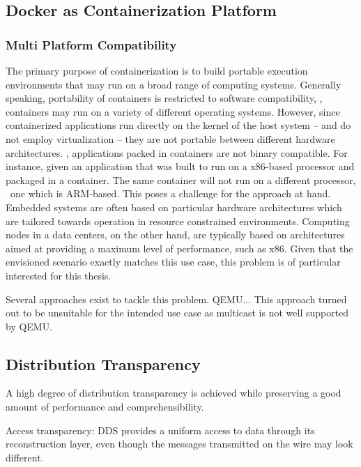 \subsection{Docker as Containerization Platform}


\subsubsection{Multi Platform Compatibility}

The primary purpose of containerization is to build portable execution environments that may run on a broad range of computing systems. Generally speaking, portability of containers is restricted to software compatibility, \ie , containers may run on a variety of different operating systems. However, since containerized applications run directly on the kernel of the host system -- and do not employ virtualization -- they are not portable between different hardware architectures. \Ie , applications packed in containers are not binary compatible. For instance, given an application that was built to run on a x86-based processor and packaged in a container. The same container will not run on a different processor, \eg\ one which is ARM-based. This poses a challenge for the approach at hand. Embedded systems are often based on particular hardware architectures which are tailored towards operation in resource constrained environments. Computing nodes in a data centers, on the other hand, are typically based on architectures aimed at providing a maximum level of performance, such as x86. Given that the envisioned scenario exactly matches this use case, this problem is of particular interested for this thesis.

Several approaches exist to tackle this problem. QEMU... This approach turned out to be unsuitable for the intended use case as multicast is not well supported by QEMU.






\subsection{Distribution Transparency}

A high degree of distribution transparency is achieved while preserving a good amount of performance and comprehensibility.

Access transparency: DDS provides a uniform access to data through its reconstruction layer, even though the messages transmitted on the wire may look different.

